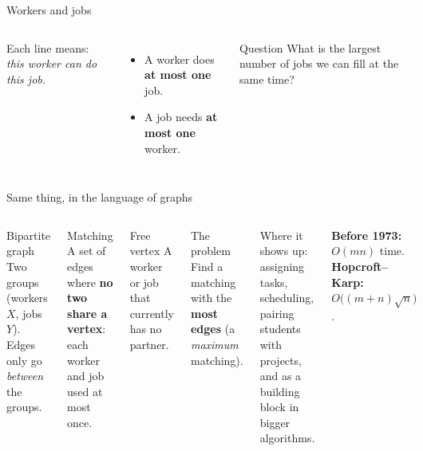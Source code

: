 \documentclass[aspectratio=169,11pt]{beamer}
\begin{document}
\begin{frame}{Workers and jobs}
\begin{columns}[c]
\centering
{}
\Large
Each line means: \emph{this worker can do this job.}\\[4mm]
\normalsize
\begin{itemize}\setlength\itemsep{8pt}
  \item A worker does \textbf{at most one} job.
  \item A job needs \textbf{at most one} worker.
\end{itemize}
\vspace{3mm}
\begin{alertblock}{Question}
What is the largest number of jobs we can fill at the same time?
\end{alertblock}
\end{columns}
\end{frame}

\begin{frame}{Same thing, in the language of graphs}
\begin{columns}[T]
\begin{block}{Bipartite graph}
Two groups (workers $X$, jobs $Y$). Edges only go \emph{between} the groups.
\end{block}
\begin{block}{Matching}
A set of edges where \textbf{no two share a vertex}: each worker and job used at most once.
\end{block}
\begin{block}{Free vertex}
A worker or job that currently has no partner.
\end{block}
\begin{alertblock}{The problem}
Find a matching with the \textbf{most edges} (a \emph{maximum} matching).
\end{alertblock}
\vspace{3mm}
Where it shows up: assigning tasks, scheduling, pairing students with projects, and as a building block in bigger algorithms.
\vspace{4mm}

\textbf{Before 1973:} $O(mn)$ time.\\
\textbf{Hopcroft--Karp:} $O\big((m+n)\sqrt n\big)$.
\end{columns}
\end{frame}
\end{document}
